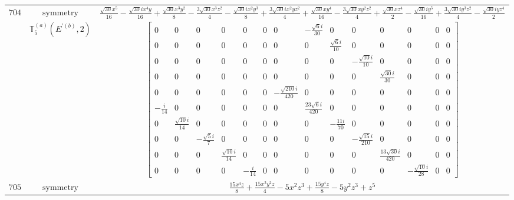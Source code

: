 \documentclass[fleqn,8pt,landscape]{jsarticle}
\begin{document}
\begin{longtable}{ccc}
$ 704 $ & $ \text{symmetry} $ & $ \frac{\sqrt{30} x^{5}}{16} - \frac{\sqrt{30} i x^{4} y}{16} + \frac{\sqrt{30} x^{3} y^{2}}{8} - \frac{3 \sqrt{30} x^{3} z^{2}}{4} - \frac{\sqrt{30} i x^{2} y^{3}}{8} + \frac{3 \sqrt{30} i x^{2} y z^{2}}{4} + \frac{\sqrt{30} x y^{4}}{16} - \frac{3 \sqrt{30} x y^{2} z^{2}}{4} + \frac{\sqrt{30} x z^{4}}{2} - \frac{\sqrt{30} i y^{5}}{16} + \frac{3 \sqrt{30} i y^{3} z^{2}}{4} - \frac{\sqrt{30} i y z^{4}}{2} $ \\
$  $ & $ \mathbb{T}_{5}^{(a)}(E^{\prime(b)},2) $ & $ \begin{bmatrix} 0 & 0 & 0 & 0 & 0 & 0 & 0 & - \frac{\sqrt{6} i}{30} & 0 & 0 & 0 & 0 & 0 & 0 \\ 0 & 0 & 0 & 0 & 0 & 0 & 0 & 0 & \frac{\sqrt{6} i}{10} & 0 & 0 & 0 & 0 & 0 \\ 0 & 0 & 0 & 0 & 0 & 0 & 0 & 0 & 0 & - \frac{\sqrt{10} i}{10} & 0 & 0 & 0 & 0 \\ 0 & 0 & 0 & 0 & 0 & 0 & 0 & 0 & 0 & 0 & \frac{\sqrt{30} i}{30} & 0 & 0 & 0 \\ 0 & 0 & 0 & 0 & 0 & 0 & - \frac{\sqrt{210} i}{420} & 0 & 0 & 0 & 0 & 0 & 0 & 0 \\ - \frac{i}{14} & 0 & 0 & 0 & 0 & 0 & 0 & \frac{23 \sqrt{6} i}{420} & 0 & 0 & 0 & 0 & 0 & 0 \\ 0 & \frac{\sqrt{10} i}{14} & 0 & 0 & 0 & 0 & 0 & 0 & - \frac{11 i}{70} & 0 & 0 & 0 & 0 & 0 \\ 0 & 0 & - \frac{\sqrt{5} i}{7} & 0 & 0 & 0 & 0 & 0 & 0 & - \frac{\sqrt{15} i}{210} & 0 & 0 & 0 & 0 \\ 0 & 0 & 0 & \frac{\sqrt{10} i}{14} & 0 & 0 & 0 & 0 & 0 & 0 & \frac{13 \sqrt{30} i}{420} & 0 & 0 & 0 \\ 0 & 0 & 0 & 0 & - \frac{i}{14} & 0 & 0 & 0 & 0 & 0 & 0 & - \frac{\sqrt{10} i}{28} & 0 & 0 \end{bmatrix} $ \\ \hline
$ 705 $ & $ \text{symmetry} $ & $ \frac{15 x^{4} z}{8} + \frac{15 x^{2} y^{2} z}{4} - 5 x^{2} z^{3} + \frac{15 y^{4} z}{8} - 5 y^{2} z^{3} + z^{5} $ \\

\end{longtable}
\end{document}
